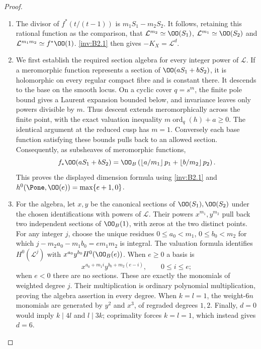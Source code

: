 \begin{proof}
\begin{enumerate}[label=\arabic*.,leftmargin=*]
\item The divisor of $f^*(t/(t-1))$ is $m_1S_1-m_2S_2$.
It follows, retaining this rational function as the comparison, that
$\mathcal L^{m_2}\simeq\OO(S_1)$,
$\mathcal L^{m_1}\simeq\OO(S_2)$ and
$\mathcal L^{m_1m_2}\simeq f^*\OO(1)$.
\ref{inv:B2.1} then gives $-K_X=\mathcal L^d$.

\item We first establish the required section algebra for every integer
power of $\mathcal L$. If a meromorphic function represents a section
of $\OO(aS_1+bS_2)$, it is holomorphic on every regular compact fibre
and is constant there. It descends to the base on the smooth locus.
On a cyclic cover $q=s^m$, the finite pole bound gives a Laurent
expansion bounded below, and invariance leaves only powers divisible
by $m$. Thus descent extends meromorphically across the finite point,
with the exact valuation inequality $m\operatorname{ord}_q(h)+a\ge0$.
The identical argument at the reduced cusp has $m=1$.
Conversely each base function satisfying these bounds pulls back to
an allowed section. Consequently, as subsheaves of meromorphic functions,
\[
f_*\OO(aS_1+bS_2)=
\OO_B\left(\left\lfloor a/m_1\right\rfloor p_1+
\left\lfloor b/m_2\right\rfloor p_2\right).
\]
This proves the displayed dimension formula using \ref{inv:B2.1} and
$h^0(\Pone,\OO(e))=\max\{e+1,0\}$.

\item For the algebra, let $x,y$ be the canonical sections of
$\OO(S_1),\OO(S_2)$ under the chosen identifications with powers of
$\mathcal L$. Their powers $x^{m_1},y^{m_2}$ pull back two independent
sections of $\OO_B(1)$, with zeros at the two distinct points.
For any integer $j$, choose the unique residues
$0\le a_0<m_1$, $0\le b_0<m_2$ for which
$j-m_2a_0-m_1b_0=e m_1m_2$ is integral.
The valuation formula identifies $H^0(\mathcal L^j)$ with
$x^{a_0}y^{b_0}H^0(\OO_B(e))$. When $e\ge0$ a basis is
\[
x^{a_0+m_1i}y^{b_0+m_2(e-i)},\qquad0\le i\le e;
\]
when $e<0$ there are no sections. These are exactly the monomials of
weighted degree $j$. Their multiplication is ordinary polynomial
multiplication, proving the algebra assertion in every degree.
When $k=l=1$, the weight-$6n$ monomials are generated by $y^2$ and
$x^3$, of regraded degrees $1,2$.
Finally, $d=0$ would imply $k\mid4l$ and $l\mid3k$; coprimality
forces $k=l=1$, which instead gives $d=6$.
\end{enumerate}
\end{proof}

